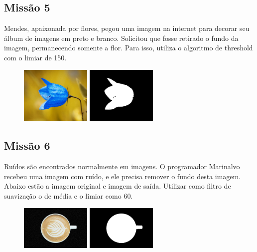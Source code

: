 \documentclass[
	12pt,				%
	oneside,			%
	a4paper,			%
	english,			%
	french,				%
	spanish,			%
	brazil,				%
	]{abntex2}
\begin{document}
\begin{apendicesenv}
\subsection{Missão 5}

Mendes, apaixonada por flores, pegou uma imagem na internet para decorar seu álbum de imagens em preto e branco. Solicitou que fosse retirado o fundo da imagem, permanecendo somente a flor. Para isso, utiliza o algoritmo de threshold com o limiar de 150.

\begin{figure}[H]
\centering
\includegraphics[width=0.3\textwidth]{imagens/desafioestudio/mission5_input.jpg}
\includegraphics[width=0.3\textwidth]{imagens/desafioestudio/mission5_output.png}
\end{figure}

\subsection{Missão 6}

Ruídos são encontrados normalmente em imagens. O programador Marinalvo recebeu uma imagem com ruído, e ele precisa remover o fundo desta imagem. Abaixo estão a imagem original e imagem de saída. Utilizar como filtro de suavização o de média e o limiar como 60.

\begin{figure}[H]
\centering
\includegraphics[width=0.3\textwidth]{imagens/desafioestudio/mission6_input.jpg}
\includegraphics[width=0.3\textwidth]{imagens/desafioestudio/mission6_output.png}
\end{figure}



\end{apendicesenv}


\printindex
\end{document}
